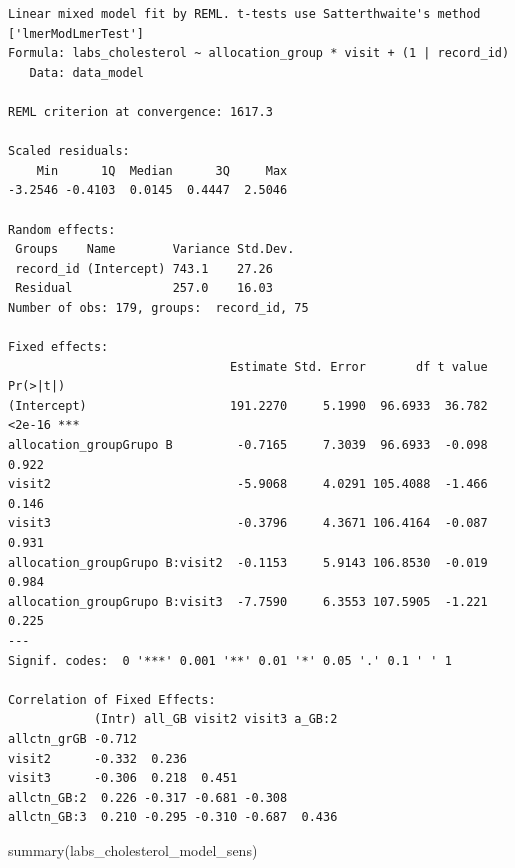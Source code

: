 \documentclass[
  12pt,
]{article}
\newenvironment{Shaded}{\begin{snugshade}}{\end{snugshade}}
\newcommand{\FunctionTok}[1]{\textcolor[rgb]{0.28,0.35,0.67}{#1}}
\newcommand{\NormalTok}[1]{\textcolor[rgb]{0.00,0.23,0.31}{#1}}
\begin{document}
\begin{verbatim}
Linear mixed model fit by REML. t-tests use Satterthwaite's method ['lmerModLmerTest']
Formula: labs_cholesterol ~ allocation_group * visit + (1 | record_id)
   Data: data_model

REML criterion at convergence: 1617.3

Scaled residuals: 
    Min      1Q  Median      3Q     Max 
-3.2546 -0.4103  0.0145  0.4447  2.5046 

Random effects:
 Groups    Name        Variance Std.Dev.
 record_id (Intercept) 743.1    27.26   
 Residual              257.0    16.03   
Number of obs: 179, groups:  record_id, 75

Fixed effects:
                               Estimate Std. Error       df t value Pr(>|t|)    
(Intercept)                    191.2270     5.1990  96.6933  36.782   <2e-16 ***
allocation_groupGrupo B         -0.7165     7.3039  96.6933  -0.098    0.922    
visit2                          -5.9068     4.0291 105.4088  -1.466    0.146    
visit3                          -0.3796     4.3671 106.4164  -0.087    0.931    
allocation_groupGrupo B:visit2  -0.1153     5.9143 106.8530  -0.019    0.984    
allocation_groupGrupo B:visit3  -7.7590     6.3553 107.5905  -1.221    0.225    
---
Signif. codes:  0 '***' 0.001 '**' 0.01 '*' 0.05 '.' 0.1 ' ' 1

Correlation of Fixed Effects:
            (Intr) all_GB visit2 visit3 a_GB:2
allctn_grGB -0.712                            
visit2      -0.332  0.236                     
visit3      -0.306  0.218  0.451              
allctn_GB:2  0.226 -0.317 -0.681 -0.308       
allctn_GB:3  0.210 -0.295 -0.310 -0.687  0.436
\end{verbatim}

\begin{Shaded}
\begin{Highlighting}[]
\FunctionTok{summary}\NormalTok{(labs\_cholesterol\_model\_sens)}
\end{Highlighting}
\end{Shaded}
\end{document}
